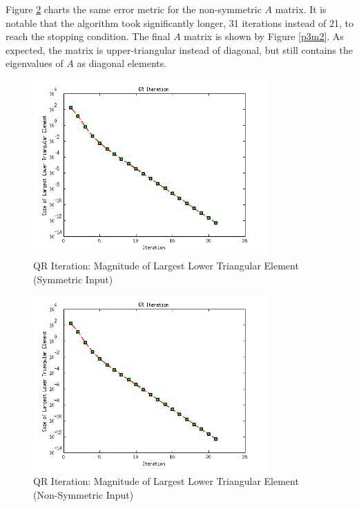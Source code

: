 \documentclass{article}
\begin{document}
Figure \ref{p3f2} charts the same error metric for the non-symmetric \(A\) matrix. It is notable that the algorithm took significantly longer, 31 iterations instead of 21, to reach the stopping condition. The final \(A\) matrix is shown by Figure \ref{p3m2}. As expected, the matrix is upper-triangular instead of diagonal, but still contains the eigenvalues of \(A\) as diagonal elements.

\begin{figure}
\centering
\includegraphics[width=0.8\textwidth]{Problem3Figure1.png}
\caption{QR Iteration: Magnitude of Largest Lower Triangular Element (Symmetric Input)}
\label{p3f1}
\end{figure}

\begin{figure}
\centering
\includegraphics[width=0.8\textwidth]{Problem3Figure1.png}
\caption{QR Iteration: Magnitude of Largest Lower Triangular Element (Non-Symmetric Input)}
\label{p3f2}
\end{figure}
\end{document}
